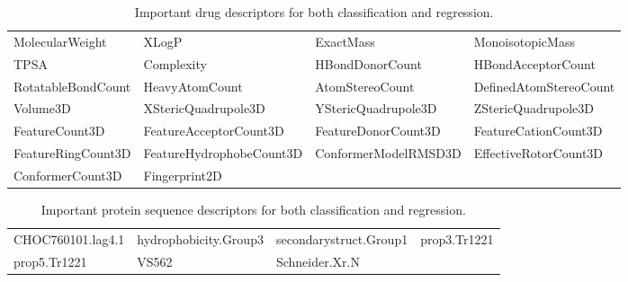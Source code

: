 \begin{table}
    \centering
    \begin{tabular}{llll}
    \toprule
    MolecularWeight & XLogP & ExactMass & MonoisotopicMass \\
    TPSA & Complexity & HBondDonorCount & HBondAcceptorCount \\
    RotatableBondCount & HeavyAtomCount & AtomStereoCount & DefinedAtomStereoCount \\
    Volume3D & XStericQuadrupole3D & YStericQuadrupole3D & ZStericQuadrupole3D \\ FeatureCount3D &  FeatureAcceptorCount3D & FeatureDonorCount3D & FeatureCationCount3D \\ FeatureRingCount3D & FeatureHydrophobeCount3D & ConformerModelRMSD3D & EffectiveRotorCount3D \\
    ConformerCount3D & Fingerprint2D \\
    \bottomrule
    \end{tabular}
    \caption{Important drug descriptors for both classification and regression.}
    \label{tbl:important_drug_descriptors}
\end{table}

\begin{table}
    \centering
    \begin{tabular}{llll}
    \toprule
    CHOC760101.lag4.1 & hydrophobicity.Group3 & secondarystruct.Group1 & prop3.Tr1221 \\
    prop5.Tr1221 & VS562 & Schneider.Xr.N \\
    \bottomrule
    \end{tabular}
    \caption{Important protein sequence descriptors for both classification and regression.}
    \label{tbl:important_protein_sequence_descriptors}
\end{table}

